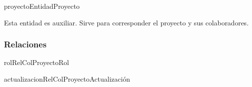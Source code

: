 \begin{BusinessEntity}{proyectoEntidad}{Proyecto}
	\item Esta entidad es auxiliar. Sirve para corresponder el proyecto y sus colaboradores.
\end{BusinessEntity}

\subsubsection{Relaciones}
\begin{BusinessFact}{rolRelColProyecto}{Rol}
\end{BusinessFact}

\begin{BusinessFact}{actualizacionRelColProyecto}{Actualización}
\end{BusinessFact}
